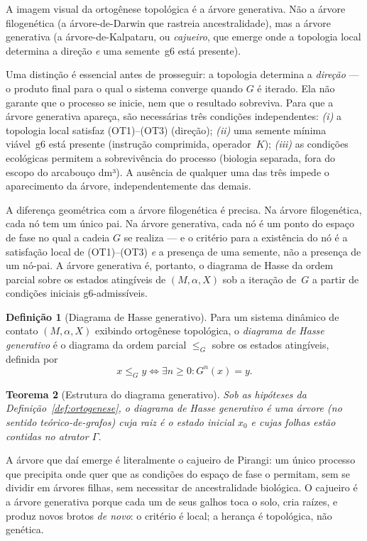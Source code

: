 \documentclass[12pt,a4paper,twoside]{book}
\theoremstyle{plain}
\newtheorem{teorema}{Teorema}[section]
\theoremstyle{definition}
\theoremstyle{definition}
\newtheorem{definicao}[teorema]{Definição}
\begin{document}
A imagem visual da ortogênese topológica é a árvore generativa. Não a
árvore filogenética (a árvore-de-Darwin que rastreia ancestralidade),
mas a árvore generativa (a árvore-de-Kalpataru, ou \emph{cajueiro},
que emerge onde a topologia local determina a direção \emph{e} uma
semente~g6 está presente).

Uma distinção é essencial antes de prosseguir: a topologia determina a
\emph{direção} --- o produto final para o qual o sistema converge quando
$G$ é iterado. Ela não garante que o processo se inicie, nem que o
resultado sobreviva. Para que a árvore generativa apareça, são necessárias
três condições independentes: \emph{(i)} a topologia local satisfaz
(OT1)--(OT3) (direção); \emph{(ii)} uma semente mínima viável~g6 está
presente (instrução comprimida, operador~$K$); \emph{(iii)} as condições
ecológicas permitem a sobrevivência do processo (biologia separada, fora
do escopo do arcabouço dm³). A ausência de qualquer uma das três impede
o aparecimento da árvore, independentemente das demais.

A diferença geométrica com a árvore filogenética é precisa. Na árvore
filogenética, cada nó tem um único pai. Na árvore generativa, cada nó é
um ponto do espaço de fase no qual a cadeia $G$ se realiza --- e o critério
para a existência do nó é a satisfação local de (OT1)--(OT3) \emph{e} a
presença de uma semente, não a presença de um nó-pai. A árvore generativa
é, portanto, o diagrama de Hasse da ordem parcial sobre os estados
atingíveis de $(M,\alpha,X)$ sob a iteração de~$G$ a partir de condições
iniciais g6-admissíveis.

\begin{definicao}[Diagrama de Hasse generativo]\label{def:hasse-gen}
Para um sistema dinâmico de contato $(M,\alpha,X)$ exibindo ortogênese
topológica, o \emph{diagrama de Hasse generativo} é o diagrama da ordem
parcial $\le_{G}$ sobre os estados atingíveis, definida por
\[
  x \le_{G} y \iff \exists n \ge 0 : G^{n}(x) = y.
\]
\end{definicao}

\begin{teorema}[Estrutura do diagrama generativo]\label{thm:hasse-arvore}
Sob as hipóteses da Definição~\ref{def:ortogenese}, o diagrama de Hasse
generativo é uma árvore (no sentido teórico-de-grafos) cuja raiz é o
estado inicial $x_{0}$ e cujas folhas estão contidas no atrator $\Gamma$.
\end{teorema}

A árvore que daí emerge é literalmente o cajueiro de Pirangi: um único
processo que precipita onde quer que as condições do espaço de fase
o permitam, sem se dividir em árvores filhas, sem necessitar de
ancestralidade biológica. O cajueiro é a árvore generativa porque cada
um de seus galhos toca o solo, cria raízes, e produz novos brotos
\emph{de novo}: o critério é local; a herança é topológica, não
genética.
\end{document}
